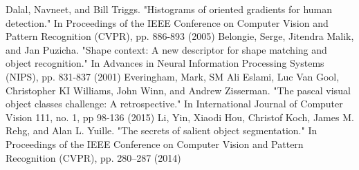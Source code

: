 \begin{thebibliography}{}
%
Dalal, Navneet, and Bill Triggs. "Histograms of oriented gradients for human detection." In Proceedings of the IEEE Conference on Computer Vision and Pattern Recognition (CVPR), pp. 886-893 (2005)
Belongie, Serge, Jitendra Malik, and Jan Puzicha. "Shape context: A new descriptor for shape matching and object recognition." In Advances in Neural Information Processing Systems (NIPS), pp. 831-837 (2001)
Everingham, Mark, SM Ali Eslami, Luc Van Gool, Christopher KI Williams, John Winn, and Andrew Zisserman. "The pascal visual object classes challenge: A retrospective." In International Journal of Computer Vision 111, no. 1, pp 98-136 (2015)
Li, Yin, Xiaodi Hou, Christof Koch, James M. Rehg, and Alan L. Yuille. "The secrets of salient object segmentation." In Proceedings of the IEEE Conference on Computer Vision and Pattern Recognition (CVPR), pp. 280–287 (2014)
\end{thebibliography}



